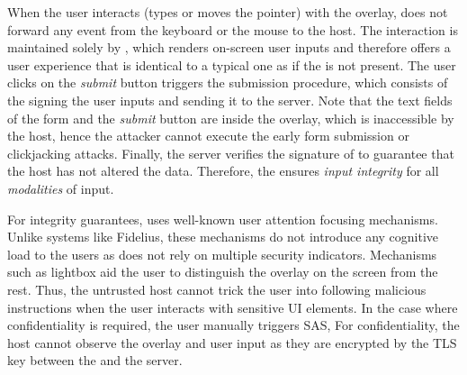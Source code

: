 When the user interacts (types or moves the pointer) with the overlay, \device does not forward any event from the keyboard or the mouse to the host. The interaction is maintained solely by \device, which renders on-screen user inputs and therefore offers a user experience that is identical to a typical one as if the \device is not present. The user clicks on the \emph{submit} button triggers the submission procedure, which consists of the \device signing the user inputs and sending it to the server. Note that the text fields of the form and the \emph{submit} button are inside the overlay, which is inaccessible by the host, hence the attacker cannot execute the early form submission or clickjacking attacks. Finally, the server verifies the signature of \device to guarantee that the host has not altered the data. Therefore, the \device ensures \emph{input integrity} for all \emph{modalities} of input.

For integrity guarantees, \name uses well-known user attention focusing mechanisms. Unlike systems like Fidelius, these mechanisms do not introduce any cognitive load to the users as \name does not rely on multiple security indicators. Mechanisms such as lightbox aid the user to distinguish the \device overlay on the screen from the rest. Thus, the untrusted host cannot trick the user into following malicious instructions when the user interacts with sensitive UI elements. In the case where confidentiality is required, the user manually triggers SAS,  For confidentiality, the host cannot observe the overlay and user input as they are encrypted by the TLS key between the \device and the server.

